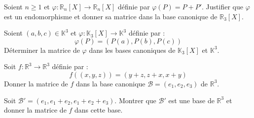 \documentclass[a4paper,10pt]{report}
\begin{document}
\newpage

\begin{Exemple}\label{det} Soient $n \geq 1$ et $\varphi : \mathbb{R}_n[X] \rightarrow \mathbb{R}_n[X]$ définie par $\varphi(P)=P+P'$. Justifier que $\varphi$ est un endomorphisme et donner sa matrice dans la base canonique de  $\mathbb{R}_3[X]$.


\vspace{7cm}


%
\end{Exemple}

\medskip

\begin{ApplicationDirecte} Soient $(a,b,c) \in \mathbb{K}^3$ et $\varphi : \mathbb{K}_3[X] \rightarrow \mathbb{K}^3$ définie par :
$$ \varphi(P) = (P(a), P(b), P(c))$$
Déterminer la matrice de $\varphi$ dans les bases canoniques de $\mathbb{K}_3[X]$ et $\mathbb{K}^3$.
\end{ApplicationDirecte}

\begin{ApplicationDirecte} Soit $f : \mathbb{R}^3 \rightarrow \mathbb{R}^3$ définie par :
$$ f((x,y,z)) = (y+z, z+x, x+y)$$
Donner la matrice de $f$ dans la base canonique $\mathcal{B}=(e_1,e_2,e_3)$ de $\mathbb{R}^3$. 

Soit $\mathcal{B}'=(e_1, e_1+e_2, e_1+e_2+e_3)$. Montrer que $\mathcal{B}'$ est une base de $\mathbb{R}^3$ et donner la matrice de $f$  dans cette base.
\end{ApplicationDirecte}

\medskip
\end{document}
